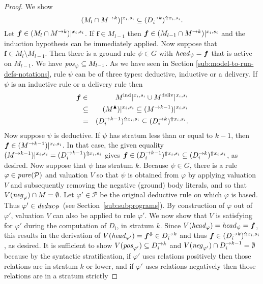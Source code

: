 \documentclass{tlp}
\newcommand{\ded}{\mathcal{P}}
\newcommand{\fc}{\boldsymbol{f}}
\newcommand{\rl}{\varphi}
\newcommand{\head}[1]{\fname{head}_{#1}}
\newcommand{\bpos}[1]{\fname{pos}_{#1}}
\newcommand{\bneg}[1]{\fname{neg}_{#1}}
\newcommand{\grl}{\psi}
\newcommand{\sh}[1]{(#1)}
\newcommand{\addlt}[3]{#1^{\Uparrow#2,#3}}
\newcommand{\projlt}[3]{#1|^{#2,#3}}
\newcommand{\shprojlt}[3]{\projlt{\sh{#1}}{#2}{#3}}
\newcommand{\shaddlt}[3]{\addlt{\sh{#1}}{#2}{#3}}
\newcommand{\droplt}[1]{#1^{\Downarrow}}
\newcommand{\pure}[1]{\fname{pure}(#1)}
\newcommand{\deduc}[1]{\fname{deduc}_{#1}}
\newcommand{\grded}{G}
\begin{document}
\begin{appendix}
\begin{proof}
We show 
\[
\shprojlt{M_{l}\cap\strat Mk}{x_{i}}{s_{i}}\subseteq\shaddlt{\strat{D_{i}}k}{x_{i}}{s_{i}}.
\]
Let $\fc\in\shprojlt{M_{l}\cap\strat Mk}{x_{i}}{s_{i}}$. If $\fc\in M_{l-1}$
then $\fc\in\shprojlt{M_{l-1}\cap\strat Mk}{x_{i}}{s_{i}}$ and the
induction hypothesis can be immediately applied. Now suppose that
$\fc\in M_{l}\setminus M_{l-1}$. Then there is a ground rule $\grl\in\grded$
with $\head{\grl}=\fc$ that is active on $M_{l-1}$. We have $\bpos{\grl}\subseteq M_{l-1}$.
As we have seen in Section \ref{sub:model-to-run-defs-notations},
rule $\grl$ can be of three types: deductive, inductive or a delivery.
If $\grl$ is an inductive rule or a delivery rule then 
\begin{eqnarray*}
\fc & \in & \projlt{\ind M}{x_{i}}{s_{i}}\cup\projlt{\deliv M}{x_{i}}{s_{i}}\\
 & \subseteq & \shprojlt{\up M}{x_{i}}{s_{i}}\subseteq\shprojlt{\strat M{k-1}}{x_{i}}{s_{i}}\\
 & = & \shaddlt{\strat{D_{i}}{k-1}}{x_{i}}{s_{i}}\subseteq\shaddlt{\strat{D_{i}}k}{x_{i}}{s_{i}}.
\end{eqnarray*}
Now suppose $\grl$ is deductive. If $\grl$ has stratum less than
or equal to $k-1$, then $\fc\in\shprojlt{\strat M{k-1}}{x_{i}}{s_{i}}$.
In that case, the given equality $\shprojlt{\strat M{k-1}}{x_{i}}{s_{i}}=\shaddlt{\strat{D_{i}}{k-1}}{x_{i}}{s_{i}}$
gives $\fc\in\shaddlt{\strat{D_{i}}{k-1}}{x_{i}}{s_{i}}\subseteq\shaddlt{\strat{D_{i}}k}{x_{i}}{s_{i}}$,
as desired. Now suppose that $\grl$ has stratum $k$. Because $\grl\in\grded$,
there is a rule $\rl\in\pure{\ded}$ and valuation $V$ so that $\grl$
is obtained from $\rl$ by applying valuation $V$ and subsequently
removing the negative (ground) body literals, and so that $V(\bneg{\rl})\cap M=\emptyset$.
Let $\rl'\in\ded$ be the original deductive rule on which $\rl$
is based. Thus $\rl'\in\deduc{\ded}$ (see Section~\ref{sub:subprograms}).
By construction of $\rl$ out of $\rl'$, valuation $V$ can also
be applied to rule $\rl'$. We now show that $V$ is satisfying for
$\rl'$ during the computation of $D_{i}$, in stratum $k$. Since
$V(\head{\rl})=\head{\grl}=\fc$, this results in the derivation of
$V(\head{\rl'})=\droplt{\fc}\in\strat{D_{i}}k$ and thus $\fc\in\shaddlt{\strat{D_{i}}k}{x_{i}}{s_{i}}$,
as desired. It is sufficient to show $V(\bpos{\rl'})\subseteq\strat{D_{i}}k$
and $V(\bneg{\rl'})\cap\strat{D_{i}}{k-1}=\emptyset$ because by the
syntactic stratification, if $\rl'$ uses relations positively then
those relations are in stratum $k$ or lower, and if $\rl'$ uses
relations negatively then those relations are in a stratum strictly

\end{proof}
\end{appendix}
\end{document}
